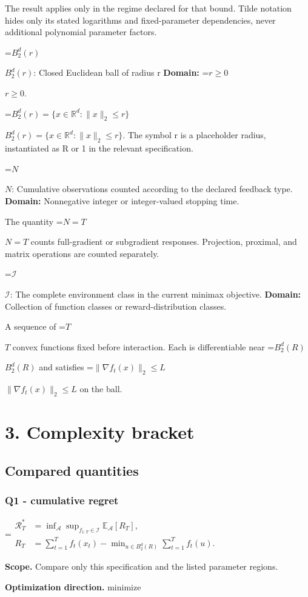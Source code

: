 \documentclass[10pt,a4paper]{article}
\newcommand{\AtlasMath}[1]{\par\begingroup\centering\setbox0=\hbox{$\displaystyle #1$}\ifdim\wd0>1.4\linewidth\typeout{ATLAS WIDE FORMULA: \the\wd0}\fi\ifdim\wd0>\linewidth\resizebox{\linewidth}{!}{\box0}\else\box0\fi\par\endgroup}
\newcommand{\AtlasInlineMath}[1]{\begingroup\setbox0=\hbox{$#1$}\ifdim\wd0>.4\linewidth\endgroup\AtlasMath{#1}\else\endgroup$#1$\fi}
\begin{document}
The result applies only in the regime declared for that bound. Tilde notation hides only its stated logarithms and fixed-parameter dependencies, never additional polynomial parameter factors.

\AtlasInlineMath{B_2^d(r)}: Closed Euclidean ball of radius r \textbf{Domain:} \AtlasInlineMath{r\ge0}.

\AtlasInlineMath{B_2^d(r)=\{x\in\mathbb R^d:\|x\|_2\le r\}}. The symbol r is a placeholder radius, instantiated as R or 1 in the relevant specification.

\AtlasInlineMath{N}: Cumulative observations counted according to the declared feedback type. \textbf{Domain:} Nonnegative integer or integer-valued stopping time.

The quantity \AtlasInlineMath{N=T} counts full-gradient or subgradient responses. Projection, proximal, and matrix operations are counted separately.

\AtlasInlineMath{\mathcal I}: The complete environment class in the current minimax objective. \textbf{Domain:} Collection of function classes or reward-distribution classes.

A sequence of \AtlasInlineMath{T} convex functions fixed before interaction. Each is differentiable near \AtlasInlineMath{B_2^d(R)} and satisfies \AtlasInlineMath{\|\nabla f_t(x)\|_2\le L} on the ball.

\section{3. Complexity bracket}
\subsection{Compared quantities}
\subsubsection{Q1 - cumulative regret}
\AtlasMath{\begin{aligned}\mathcal R_T^*&=\inf_{\mathcal A}\sup_{f_{1:T}\in\mathcal I}\mathbb E_{\mathcal A}[R_T],\\ R_T&=\sum_{t=1}^T f_t(x_t)-\min_{u\in B_2^d(R)}\sum_{t=1}^T f_t(u).\end{aligned}}
\textbf{Scope.} Compare only this specification and the listed parameter regions.

\textbf{Optimization direction.} minimize
\end{document}
